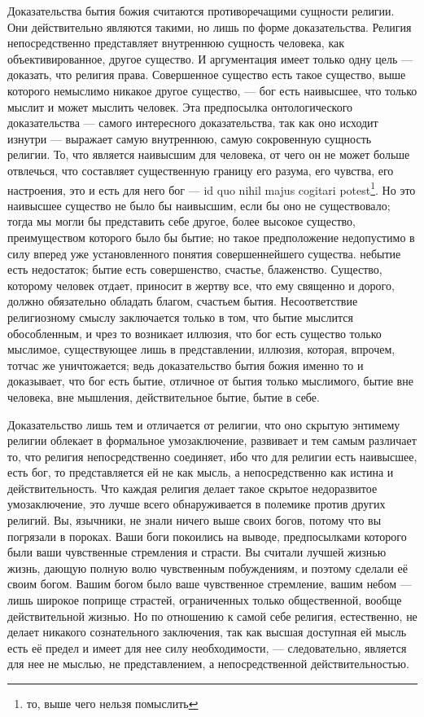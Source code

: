\documentclass[12pt,oneside]{book}
\begin{document}
Доказательства бытия божия считаются противоречащими сущности религии. Они действительно являются такими, но лишь по форме доказательства. Религия непосредственно представляет внутреннюю сущность человека, как объективированное, другое существо. И аргументация имеет только одну цель --- доказать, что религия права. Совершенное существо есть такое существо, выше которого немыслимо никакое другое существо, --- бог есть наивысшее, что только мыслит и может мыслить человек. Эта предпосылка онтологического доказательства --- самого интересного доказательства, так как оно исходит изнутри --- выражает самую внутреннюю, самую сокровенную сущность религии. То, что является наивысшим для человека, от чего он не может больше отвлечься, что составляет существенную границу его разума, его чувства, его настроения, это и есть для него бог --- id quo nihil majus cogitari potest\footnote{то, выше чего нельзя помыслить}. Но это наивысшее существо не было бы наивысшим, если бы оно не существовало; тогда мы могли бы представить себе другое, более высокое существо, преимуществом которого было бы бытие; но такое предположение недопустимо в силу вперед уже установленного понятия совершеннейшего существа. небытие есть недостаток; бытие есть совершенство, счастье, блаженство. Существо, которому человек отдает, приносит в жертву все, что ему священно и дорого, должно обязательно обладать благом, счастьем бытия. Несоответствие религиозному смыслу заключается только в том, что бытие мыслится обособленным, и чрез то возникает иллюзия, что бог есть существо только мыслимое, существующее лишь в представлении, иллюзия, которая, впрочем, тотчас же уничтожается; ведь доказательство бытия божия именно то и доказывает, что бог есть бытие, отличное от бытия только мыслимого, бытие вне человека, вне мышления, действительное бытие, бытие в себе.

Доказательство лишь тем и отличается от религии, что оно скрытую энтимему религии облекает в формальное умозаключение, развивает и тем самым различает то, что религия непосредственно соединяет, ибо что для религии есть наивысшее, есть бог, то представляется ей не как мысль, а непосредственно как истина и действительность. Что каждая религия делает такое скрытое недоразвитое умозаключение, это лучше всего обнаруживается в полемике против других религий. Вы, язычники, не знали ничего выше своих богов, потому что вы погрязали в пороках. Ваши боги покоились на выводе, предпосылками которого были ваши чувственные стремления и страсти. Вы считали лучшей жизнью жизнь, дающую полную волю чувственным побуждениям, и поэтому сделали её своим богом. Вашим богом было ваше чувственное стремление, вашим небом --- лишь широкое поприще страстей, ограниченных только общественной, вообще действительной жизнью. Но по отношению к самой себе религия, естественно, не делает никакого сознательного заключения, так как высшая доступная ей мысль есть её предел и имеет для нее силу необходимости, --- следовательно, является для нее не мыслью, не представлением, а непосредственной действительностью.
\end{document}
